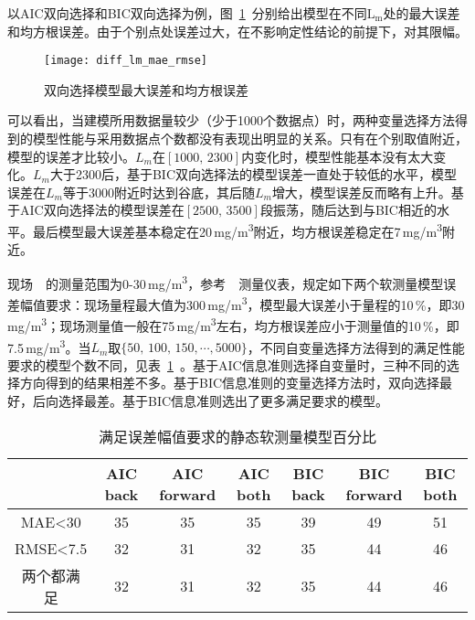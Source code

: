 以AIC双向选择和BIC双向选择为例，图~\ref{fig:diff_lm_mae_rmse}~分别给出模型在不同$\textrm{L}_{\textrm{m}}$处的最大误差和均方根误差。由于个别点处误差过大，在不影响定性结论的前提下，对其限幅。
\begin{figure}[!hbt]
\centering
\texttt{[image: diff\_lm\_mae\_rmse]}
\caption{双向选择模型最大误差和均方根误差} \label{fig:diff_lm_mae_rmse}
\end{figure}

可以看出，当建模所用数据量较少（少于1000个数据点）时，两种变量选择方法得到的模型性能与采用数据点个数都没有表现出明显的关系。只有在个别取值附近，模型的误差才比较小。$L_{m}$在$[\textrm{1000},\,\textrm{2300}]$内变化时，模型性能基本没有太大变化。$L_{m}$大于2300后，基于BIC双向选择法的模型误差一直处于较低的水平，模型误差在$L_{m}$等于3000附近时达到谷底，其后随${L}_{m}$增大，模型误差反而略有上升。基于AIC双向选择法的模型误差在$[\textrm{2500},\,\textrm{3500}]$段振荡，随后达到与BIC相近的水平。最后模型最大误差基本稳定在20$\,$\si{mg/m^3}附近，均方根误差稳定在7$\,$\si{mg/m^3}附近。

现场~~的测量范围为0-30$\,$\si{mg/m^3}，参考~~测量仪表，规定如下两个软测量模型误差幅值要求：现场量程最大值为300$\,$\si{mg/m^3}，模型最大误差小于量程的10$\,$\si{\percent}，即30$\,$\si{mg/m^3}；现场测量值一般在75$\,$\si{mg/m^3}左右，均方根误差应小于测量值的10$\,$\si{\percent}，即7.5$\,$\si{mg/m^3}。当$L_{m}$取$\{\textrm{50},\,\textrm{100},\,\textrm{150},\cdots,\textrm{5000}\}$，不同自变量选择方法得到的满足性能要求的模型个数不同，见表~\ref{tab:static_model_percent}~。基于AIC信息准则选择自变量时，三种不同的选择方向得到的结果相差不多。基于BIC信息准则的变量选择方法时，双向选择最好，后向选择最差。基于BIC信息准则选出了更多满足要求的模型。
\begingroup
\renewcommand*{\arraystretch}{1.67}
\begin{table}[!h]
\small
\centering
\caption[满足误差幅值要求的静态软测量模型百分比]{满足误差幅值要求的静态软测量模型百分比} \label{tab:static_model_percent}
\begin{tabular}{ccccccc}
\hline\hline 
	&AIC back	&AIC forward	&AIC both	&BIC back	&BIC forward	&BIC both\\
\hline
MAE<30	&35	&35	&35	&39	&49	&51\\
RMSE<7.5	&32	&31	&32	&35	&44	&46\\
两个都满足	&32	&31	&32	&35	&44	&46\\
\hline\hline
\end{tabular}
\end{table}
\endgroup




